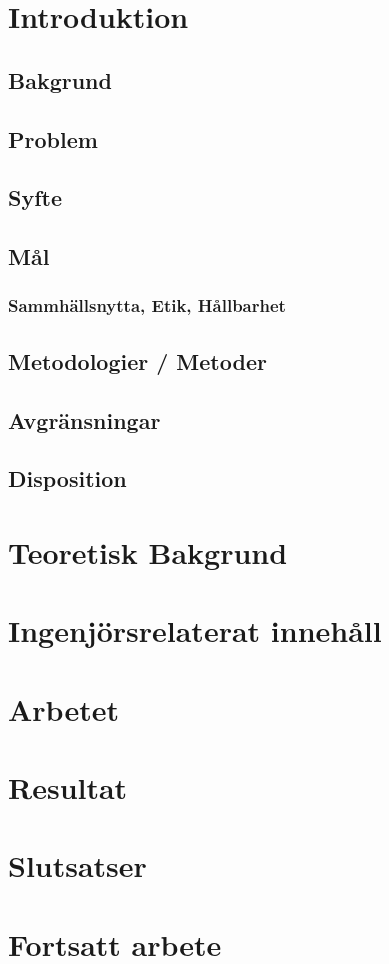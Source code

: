 \documentclass[11pt, a4paper, onecolumn]{article}
\begin{document}
	\tableofcontents
	\newpage
	
	\section{Introduktion}
	
		\subsection{Bakgrund}
		
		\subsection{Problem}
		
		\subsection{Syfte}
		
		\subsection{Mål}
		
			\subsubsection{Sammhällsnytta, Etik, Hållbarhet}
			
		\subsection{Metodologier / Metoder}
		
		\subsection{Avgränsningar}
		
		\subsection{Disposition}
		
	\newpage
		
	\section{Teoretisk Bakgrund}
	\newpage
	
	\section{Ingenjörsrelaterat innehåll}
	\newpage
	
	\section{Arbetet}
	\newpage
	
	\section{Resultat}
	\newpage
	
	\section{Slutsatser}
	\newpage
	
	\section{Fortsatt arbete}
	\newpage
		
\end{document}
